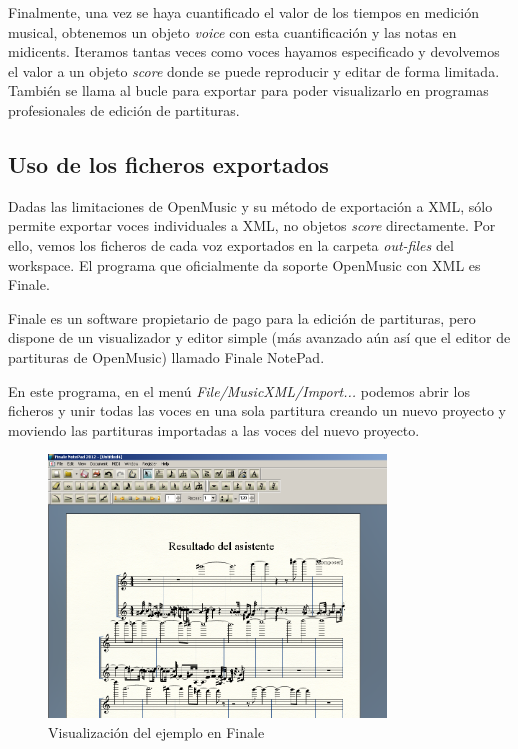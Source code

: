 \documentclass[a4paper,openany,12pt]{memoir}
\begin{document}
Finalmente, una vez se haya cuantificado el valor de los tiempos en medición musical, obtenemos un objeto \emph{voice} con esta cuantificación y las notas en midicents. Iteramos tantas veces como voces hayamos especificado y devolvemos el valor a un objeto \emph{score} donde se puede reproducir y editar de forma limitada. También se llama al bucle para exportar para poder visualizarlo en programas profesionales de edición de partituras.


\subsection{Uso de los ficheros exportados}
Dadas las limitaciones de OpenMusic y su método de exportación a XML, sólo permite exportar voces individuales a XML, no objetos \emph{score} directamente. Por ello, vemos los ficheros de cada voz exportados en la carpeta \emph{out-files} del workspace. El programa que oficialmente da soporte OpenMusic con XML es Finale. 

Finale es un software propietario de pago para la edición de partituras, pero dispone de un visualizador y editor simple (más avanzado aún así que el editor de partituras de OpenMusic) llamado Finale NotePad. 

En este programa, en el menú \emph{File/MusicXML/Import...} podemos abrir los ficheros y unir todas las voces en una sola partitura creando un nuevo proyecto y moviendo las partituras importadas a las voces del nuevo proyecto.

\begin{figure}
\centering
\includegraphics[width=0.8\textwidth]{img/finale.png}
\caption{Visualización del ejemplo en Finale} \label{fig:finale}
\end{figure}
\end{document}
